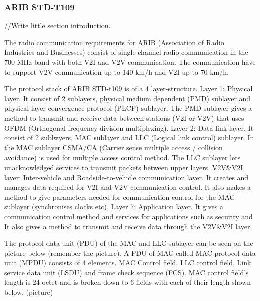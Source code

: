 \subsubsection{ARIB STD-T109}
% 
% 
//Write little section introduction.\par
% 
The radio communication requirements for ARIB (Association of Radio Industries and Businesses) consist of single channel radio communication in the 700 MHz band with both V2I and V2V communication. The communication have to support V2V communication up to 140 km/h and V2I up to 70 km/h.\par
% 
The protocol stack of ARIB STD-t109 is of a 4 layer-structure.
Layer 1: Physical layer. It consist of 2 sublayers, physical medium dependent (PMD) sublayer and physical layer convergence protocol (PLCP) sublayer. The PMD sublayer gives a method to transmit and receive data between stations (V2I or V2V) that uses OFDM (Orthogonal frequency-division multiplexing).
Layer 2: Data link layer. It consist of 2 sublwyers, MAC sublayer and LLC (Logical link control) sublayer. In the MAC sublayer CSMA/CA (Carrier sense multiple access / collision avoidance) is used for multiple access control method. The LLC sublayer lets unacknowledged services to transmit packets between upper layers.
V2V\&V2I layer: Inter-vehicle and Roadside-to-vehicle communication layer. It creates and manages data required for V2I and V2V communication control. It also makes a method to give parameters needed for communication control for the MAC sublayer (synchronises clocks etc).
Layer 7: Application layer. It gives a communication control method and services for applications such as security and It also gives a method to transmit and receive data through the V2V\&V2I layer. 
\par
The protocol data unit (PDU) of the MAC and LLC sublayer can be seen on the picture below (remember the picture). A PDU of MAC called MAC protocol data unit (MPDU) consists of 4 elements. MAC Control field, LLC control field, Link service data unit (LSDU) and frame check sequence (FCS).
MAC control field's length is 24 octet and is broken down to 6 fields with each of their length shown below. (picture)
\par
% 
